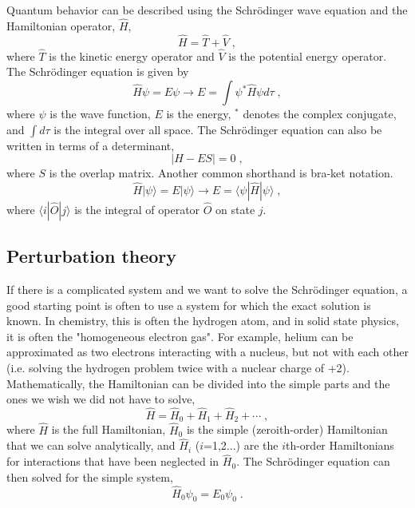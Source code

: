 \documentclass[12pt]{report}
\begin{document}
Quantum behavior can be described using the Schr\"{o}dinger wave equation and
the Hamiltonian operator, $\hat H$,
\begin{equation}
 \hat H = \hat T + \hat V \; ,
\end{equation}
where $\hat T$ is the kinetic energy operator and $\hat V$ is the potential
energy operator. The Schr\"{o}dinger equation is given by
\begin{equation}
 \hat H\psi = E\psi \to E = \int \psi^*\hat H\psi d\tau \; ,
\end{equation}
where $\psi$ is the wave function, $E$ is the energy, $^*$ denotes the complex
conjugate, and $\int d\tau$ is the integral over all space. The
Schr\"{o}dinger equation can also be written in terms of a determinant,
\begin{equation}
 |H-ES| = 0 \; ,
\end{equation}
where $S$ is the overlap matrix. Another common shorthand is bra-ket notation.
\begin{equation}
 \hat H|\psi\rangle = E|\psi\rangle \to E=\langle\psi|\hat H|\psi\rangle \; ,
\end{equation}
where $\langle i|\hat O|j\rangle$ is the integral of operator $\hat O$ on
state $j$.

\subsection{Perturbation theory}

If there is a complicated system and we want to solve the Schr\"{o}dinger 
equation, a good starting point is often to use a system for which the exact
solution is known. In chemistry, this is often the hydrogen atom, and in solid
state physics, it is often the "homogeneous electron gas". For example, helium
can be approximated as two electrons interacting with a nucleus, but not with
each other (i.e. solving the hydrogen problem twice with a nuclear charge of
+2). \\

Mathematically, the Hamiltonian can be divided into the simple parts and the
ones we wish we did not have to solve,
\begin{equation}
 \hat H = \hat H_0+\hat H_1+\hat H_2+\cdots \; ,
\end{equation}
where $\hat H$ is the full Hamiltonian, $\hat H_0$ is the simple
(zeroith-order) Hamiltonian that we can solve analytically, and $\hat H_i$
($i$=1,2...) are the $i$th-order Hamiltonians for interactions that have been
neglected in $\hat H_0$. The Schr\"{o}dinger equation can then solved for the
simple system,
\begin{equation}
 \hat H_0\psi_0=E_0\psi_0 \; .
\end{equation}
\end{document}
